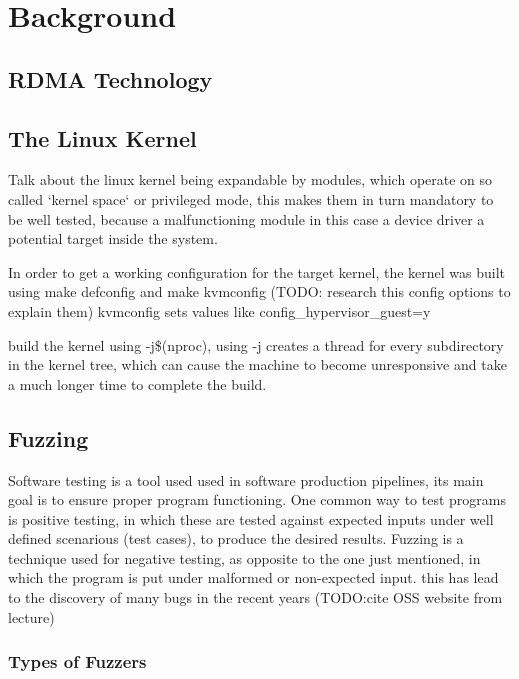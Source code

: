 \section{Background}



\subsection{RDMA Technology}


\subsection{The Linux Kernel}

Talk about the linux kernel being expandable by modules, which operate on
so called `kernel space` or privileged mode, this makes them in turn mandatory
to be well tested, because  a malfunctioning module in this case a device 
driver a potential target inside the system.

In order to get a working configuration for the target kernel, the kernel was built using make defconfig and make kvmconfig (TODO: research this config options to explain them)
kvmconfig sets values like config\_hypervisor\_guest=y

build the kernel using -j\$(nproc), using -j creates a thread for every subdirectory in the kernel tree, which can cause the machine to become unresponsive and take a much
longer time to complete the build. \cite{kroah-hartman06}

\subsection{Fuzzing}

Software testing is a tool used used in software production pipelines, its main goal is to ensure proper program functioning. One common way to test programs is 
positive testing, in which these are tested against expected inputs under well defined scenarious (test cases), to produce the desired results.
Fuzzing is a technique used for negative testing, as opposite to the one just mentioned, in which the program is put under malformed or non-expected input. this
has lead to the discovery of many bugs in the recent years (TODO:\@ cite OSS website from lecture)


\subsubsection{Types of Fuzzers}
 
